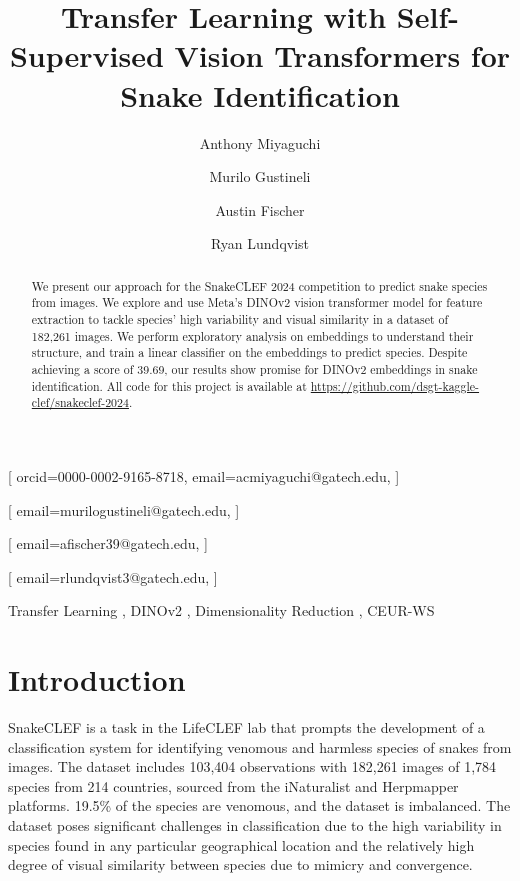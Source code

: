 \documentclass[]{ceurart}
\begin{document}


\title{Transfer Learning with Self-Supervised Vision Transformers for Snake Identification}

\author[1]{Anthony Miyaguchi}[
orcid=0000-0002-9165-8718,
email=acmiyaguchi@gatech.edu,
]
\cormark[1]
\author[1]{Murilo Gustineli}[
email=murilogustineli@gatech.edu,
]
\cormark[1]
\author[1]{Austin Fischer}[
email=afischer39@gatech.edu,
]
\author[1]{Ryan Lundqvist}[
email=rlundqvist3@gatech.edu,
]

\address[1]{Georgia Institute of Technology, North Ave NW, Atlanta, GA 30332}


\begin{abstract}
    We present our approach for the SnakeCLEF 2024 competition to predict snake species from images.
    We explore and use Meta's DINOv2 vision transformer model for feature extraction to tackle species' high variability and visual similarity in a dataset of 182,261 images. 
    We perform exploratory analysis on embeddings to understand their structure, and train a linear classifier on the embeddings to predict species.
    Despite achieving a score of 39.69, our results show promise for DINOv2 embeddings in snake identification. 
    All code for this project is available at \url{https://github.com/dsgt-kaggle-clef/snakeclef-2024}.
\end{abstract}

\begin{keywords}
  Transfer Learning \sep
  DINOv2 \sep
  Dimensionality Reduction \sep
  CEUR-WS
\end{keywords}

\maketitle

\section{Introduction}

SnakeCLEF \cite{snakeclef2024} is a task in the LifeCLEF lab \cite{lifeclef2024} that prompts the development of a classification system for identifying venomous and harmless species of snakes from images.
The dataset includes 103,404 observations with 182,261 images of 1,784 species from 214 countries, sourced from the iNaturalist and Herpmapper platforms. 
19.5\% of the species are venomous, and the dataset is imbalanced.
The dataset poses significant challenges in classification due to the high variability in species found in any particular geographical location and the relatively high degree of visual similarity between species due to mimicry and convergence.
\end{document}
